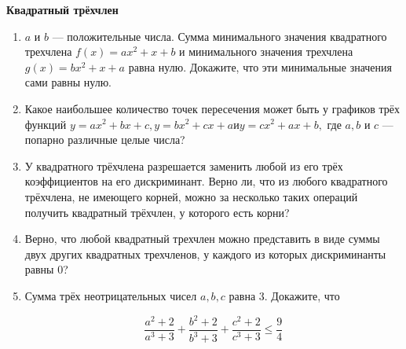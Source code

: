 \documentclass{article}
\begin{document}
\large
	

\begin{center}
\textbf{Квадратный трёхчлен}
\end{center}

\begin{enumerate}[label*=\protect\fbox{\arabic{enumi}}]
	
	\item $a$ и $b$ — положительные числа. Сумма минимального значения квадратного трехчлена
	$f(x) = ax^2 + x + b$ и минимального значения трехчлена $g(x) = bx^2 + x + a$ равна нулю.
	Докажите, что эти минимальные значения сами равны нулю.
	
	\item Какое наибольшее количество точек пересечения может быть у графиков трёх функций
	$y = ax^2 + bx + c, y = bx^2 + cx + a и y = cx^2 + ax + b,$ где $a, b$ и $c$ — попарно различные целые
	числа?
	
	\item У квадратного трёхчлена разрешается заменить любой из его трёх коэффициентов на его
	дискриминант. Верно ли, что из любого квадратного трёхчлена, не имеющего корней, можно за несколько таких операций получить квадратный трёхчлен, у которого есть корни?
	
	\item Верно, что любой квадратный трехчлен можно представить в виде суммы двух других квадратных трехчленов, у каждого из которых дискриминанты равны 0?
	
	\item Сумма трёх неотрицательных чисел $a, b, c$ равна 3. Докажите, что
	
	\[
	\frac{a^2 + 2}{a^3 + 3} + 
	\frac{b^2 + 2}{b^3 + 3}+ 
	\frac{c^2 + 2}{c^3 + 3} \leqslant \frac{9}{4}
	\]
	
\end{enumerate}
\end{document}
